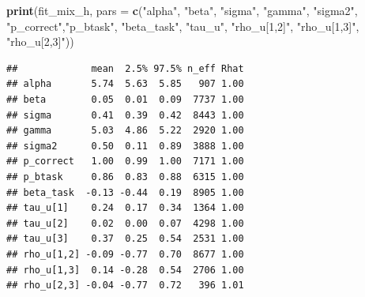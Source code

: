 \documentclass[12pt,]{krantz}
\newenvironment{Shaded}{\begin{snugshade}}{\end{snugshade}}
\newcommand{\DataTypeTok}[1]{\textcolor[rgb]{0.13,0.29,0.53}{#1}}
\newcommand{\DecValTok}[1]{\textcolor[rgb]{0.00,0.00,0.81}{#1}}
\newcommand{\FloatTok}[1]{\textcolor[rgb]{0.00,0.00,0.81}{#1}}
\newcommand{\KeywordTok}[1]{\textcolor[rgb]{0.13,0.29,0.53}{\textbf{#1}}}
\newcommand{\NormalTok}[1]{#1}
\newcommand{\OperatorTok}[1]{\textcolor[rgb]{0.81,0.36,0.00}{\textbf{#1}}}
\newcommand{\StringTok}[1]{\textcolor[rgb]{0.31,0.60,0.02}{#1}}
\theoremstyle{definition}
\theoremstyle{definition}
\theoremstyle{definition}
\theoremstyle{remark}
\begin{document}
\begin{Shaded}
\end{Shaded}

\begin{Shaded}
\begin{Highlighting}[]
\KeywordTok{print}\NormalTok{(fit_mix_h, }\DataTypeTok{pars =} \KeywordTok{c}\NormalTok{(}\StringTok{"alpha"}\NormalTok{, }\StringTok{"beta"}\NormalTok{, }\StringTok{"sigma"}\NormalTok{, }\StringTok{"gamma"}\NormalTok{, }\StringTok{"sigma2"}\NormalTok{,}
                          \StringTok{"p_correct"}\NormalTok{,}\StringTok{"p_btask"}\NormalTok{, }\StringTok{"beta_task"}\NormalTok{, }\StringTok{"tau_u"}\NormalTok{,}
                          \StringTok{"rho_u[1,2]"}\NormalTok{, }\StringTok{"rho_u[1,3]"}\NormalTok{, }\StringTok{"rho_u[2,3]"}\NormalTok{))}
\end{Highlighting}
\end{Shaded}

\begin{verbatim}
##             mean  2.5% 97.5% n_eff Rhat
## alpha       5.74  5.63  5.85   907 1.00
## beta        0.05  0.01  0.09  7737 1.00
## sigma       0.41  0.39  0.42  8443 1.00
## gamma       5.03  4.86  5.22  2920 1.00
## sigma2      0.50  0.11  0.89  3888 1.00
## p_correct   1.00  0.99  1.00  7171 1.00
## p_btask     0.86  0.83  0.88  6315 1.00
## beta_task  -0.13 -0.44  0.19  8905 1.00
## tau_u[1]    0.24  0.17  0.34  1364 1.00
## tau_u[2]    0.02  0.00  0.07  4298 1.00
## tau_u[3]    0.37  0.25  0.54  2531 1.00
## rho_u[1,2] -0.09 -0.77  0.70  8677 1.00
## rho_u[1,3]  0.14 -0.28  0.54  2706 1.00
## rho_u[2,3] -0.04 -0.77  0.72   396 1.01
\end{verbatim}
\end{document}
